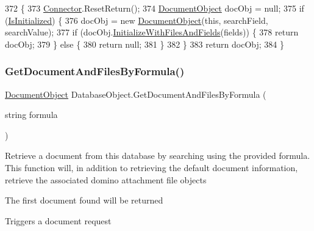 \begin{DoxyCode}
372                                                                                                            
              \{
373         \mbox{\hyperlink{class_connector}{Connector}}.ResetReturn();
374         \mbox{\hyperlink{class_document_object}{DocumentObject}} docObj = null;
375         \textcolor{keywordflow}{if} (\mbox{\hyperlink{class_database_object_a5fe036d32a30eb10d1b3f6a30263f740}{IsInitialized}}) \{
376             docObj = \textcolor{keyword}{new} \mbox{\hyperlink{class_document_object}{DocumentObject}}(\textcolor{keyword}{this}, searchField, searchValue);
377             \textcolor{keywordflow}{if} (docObj.\mbox{\hyperlink{class_document_object_a16350c0f471c95c82b418b7f1dc53694}{InitializeWithFilesAndFields}}(fields)) \{
378                 \textcolor{keywordflow}{return} docObj;
379             \} \textcolor{keywordflow}{else} \{
380                 \textcolor{keywordflow}{return} null;
381             \}
382         \}
383         \textcolor{keywordflow}{return} docObj;
384     \}
\end{DoxyCode}
\mbox{\label{class_database_object_a1d35f51baee4be6adb69a954efe5b4bf}} 
\subsubsection{\texorpdfstring{Get\+Document\+And\+Files\+By\+Formula()}{GetDocumentAndFilesByFormula()}}
{\footnotesize\ttfamily \mbox{\hyperlink{class_document_object}{Document\+Object}} Database\+Object.\+Get\+Document\+And\+Files\+By\+Formula (\begin{DoxyParamCaption}\item[{string}]{formula }\end{DoxyParamCaption})}



Retrieve a document from this database by searching using the provided formula. This function will, in addition to retrieving the default document information, retrieve the associated domino attachment file objects 

The first document found will be returned

Triggers a document request

